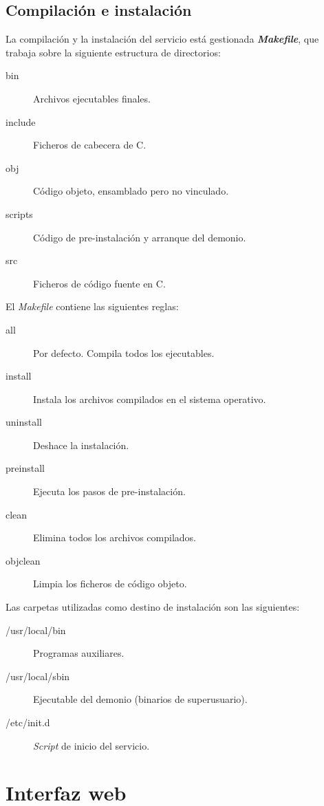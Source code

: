 \subsection{Compilación e instalación}

La compilación y la instalación del servicio está gestionada \textbf{\textit{Makefile}}, que trabaja sobre la siguiente estructura de directorios:

\begin{description}
	\item[bin] Archivos ejecutables finales.
	\item[include] Ficheros de cabecera de C.
	\item[obj] Código objeto, ensamblado pero no vinculado.
	\item[scripts] Código de pre-instalación y arranque del demonio.
	\item[src] Ficheros de código fuente en C.
\end{description}

El \textit{Makefile} contiene las siguientes reglas:

\begin{description}
	\item[all] Por defecto. Compila todos los ejecutables.
	\item[install] Instala los archivos compilados en el sistema operativo.
	\item[uninstall] Deshace la instalación.
	\item[preinstall] Ejecuta los pasos de pre-instalación.
	\item[clean] Elimina todos los archivos compilados.
	\item[objclean] Limpia los ficheros de código objeto.
\end{description}

Las carpetas utilizadas como destino de instalación son las siguientes:

\begin{description}
	\item[/usr/local/bin] Programas auxiliares.
	\item[/usr/local/sbin] Ejecutable del demonio (binarios de superusuario).
	\item[/etc/init.d] \textit{Script} de inicio del servicio.
\end{description}

\section{Interfaz web}


